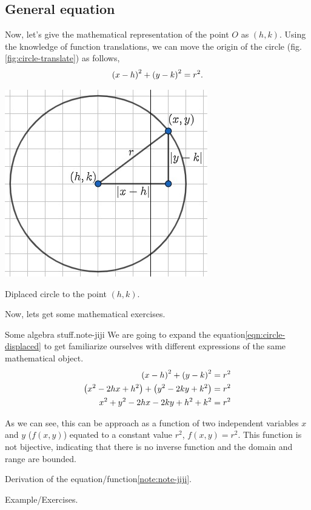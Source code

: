 \documentclass[../main-notes.tex]{subfiles}
\begin{document}
\subsection{General equation}

Now, let's give the mathematical representation of the point $O$ as $(h,k)$.
Using the knowledge of function translations, we can move the origin of the circle (fig.\ref{fig:circle-translate}) as follows,
\begin{gather}
    \qty(x-h)^2 + \qty(y-k)^2 = r^2.\label{eqn:circle-displaced}
\end{gather}

\begin{marginfigure}
    \centering
    \includegraphics[widht=0.45\textwidth]{../Figures/circunference/circle-translate.jpg}
    \caption{Diplaced circle to the point $(h,k)$.}\label{fig:circle-translate}
\end{marginfigure}

Now, lets get some mathematical exercises.

\begin{note}{Some algebra stuff.}{note-jiji}
    We are going to expand the equation\eqref{eqn:circle-displaced} to get familiarize ourselves with different expressions of the same mathematical object.
    \begin{align*}
        \qty(x-h)^2 + \qty(y-k)^2 &= r^2 \\
        \qty(x^2 -2hx + h^2) + \qty(y^2 -2ky + k^2) &= r^2 \\
        x^2 + y^2 -2hx -2ky + h^2 + k^2 &= r^2
    \end{align*}

    As we can see, this can be approach as a function of two independent variables $x$ and $y$ ($f(x,y)$) equated to a constant value $r^2$, $f(x,y)=r^2$.
    This function is not bijective, indicating that there is no inverse function and the domain and range are bounded.

\end{note}




Derivation of the equation/function\cref{note:note-jiji}.




Example/Exercises.
\end{document}
